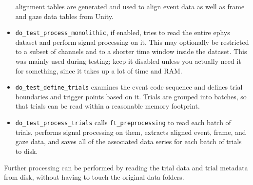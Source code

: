 \begin{itemize}
alignment tables are generated and used to align event data as well as frame
and gaze data tables from Unity.
%
\item \verb|do_test_process_monolithic|, if enabled, tries to read the
entire ephys dataset and perform signal processing on it. This may optionally
be restricted to a subset of channels and to a shorter time window inside
the dataset. This was mainly used during testing; keep it disabled unless
you actually need it for something, since it takes up a lot of time and RAM.
%
\item \verb|do_test_define_trials| examines the event code sequence and
defines trial boundaries and trigger points based on it. Trials are grouped
into batches, so that trials can be read within a reasonable memory footprint.
%
\item \verb|do_test_process_trials| calls \verb|ft_preprocessing| to read
each batch of trials, performs signal processing on them, extracts aligned
event, frame, and gaze data, and saves all of the associated data series
for each batch of trials to disk.
%
\end{itemize}

Further processing can be performed by reading the trial data and trial
metadata from disk, without having to touch the original data folders.

%
